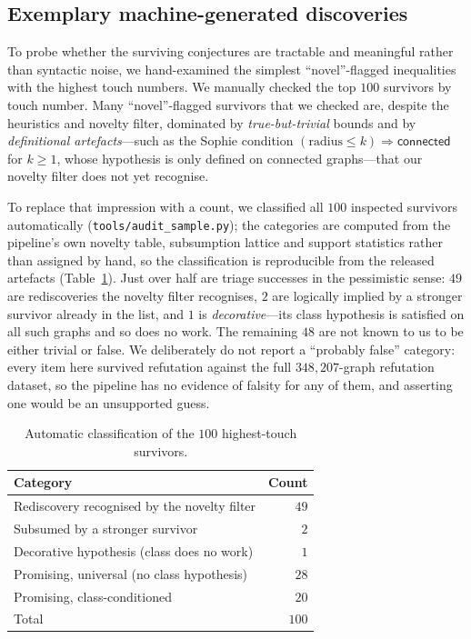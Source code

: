 \documentclass[]{ceurart}
\begin{document}
\subsection{Exemplary machine-generated discoveries}
\label{sec:worked}

To probe whether the surviving conjectures are tractable and meaningful rather than syntactic noise, we
hand-examined the simplest ``novel''-flagged inequalities with the highest touch numbers. We manually checked the top $100$ survivors by touch number. Many ``novel''-flagged survivors that we checked are, despite the heuristics and novelty filter, dominated by
\emph{true-but-trivial} bounds and by \emph{definitional artefacts}---such as the Sophie condition
$(\mathrm{radius}\le k)\Rightarrow\textsf{connected}$ for $k\ge 1$, whose hypothesis is
only defined on connected graphs---that our novelty filter does not yet recognise.

To replace that impression with a count, we classified all $100$ inspected survivors
automatically (\texttt{tools/audit\_sample.py}); the categories are computed from the
pipeline's own novelty table, subsumption lattice and support statistics rather than
assigned by hand, so the classification is reproducible from the released artefacts
(Table~\ref{tab:audit}). Just over half are triage successes in the pessimistic sense:
$49$ are rediscoveries the novelty filter recognises, $2$ are logically implied by a
stronger survivor already in the list, and $1$ is \emph{decorative}---its class
hypothesis is satisfied on all such graphs and so does no work. The remaining $48$ are not
known to us to be either trivial or false. We deliberately do not report a
``probably false'' category: every item here survived refutation against the full
$348{,}207$-graph refutation dataset, so the pipeline has no evidence of falsity for any of them,
and asserting one would be an unsupported guess.

\begin{table}[!h]
  \caption{Automatic classification of the $100$ highest-touch survivors.}
  \label{tab:audit}
  \begin{tabular}{lr}
    \toprule
    Category & Count \\
    \midrule
    Rediscovery recognised by the novelty filter & $49$ \\
    Subsumed by a stronger survivor & $2$ \\
    Decorative hypothesis (class does no work) & $1$ \\
    Promising, universal (no class hypothesis) & $28$ \\
    Promising, class-conditioned & $20$ \\
    \midrule
    Total & $100$ \\
    \bottomrule
  \end{tabular}
\end{table}
\end{document}
